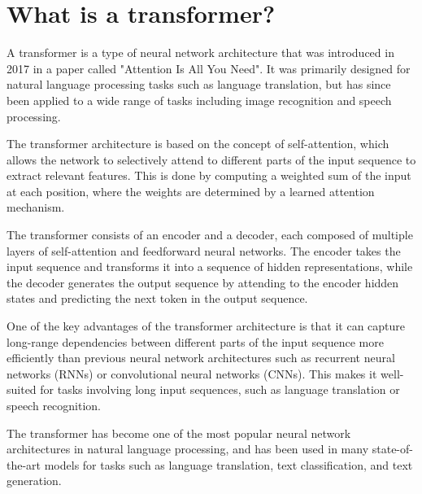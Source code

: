 \section{What is a transformer?}
A transformer is a type of neural network architecture that was introduced in 2017 in a paper called "Attention Is All You Need". It was primarily designed for natural language processing tasks such as language translation, but has since been applied to a wide range of tasks including image recognition and speech processing.

The transformer architecture is based on the concept of self-attention, which allows the network to selectively attend to different parts of the input sequence to extract relevant features. This is done by computing a weighted sum of the input at each position, where the weights are determined by a learned attention mechanism.

The transformer consists of an encoder and a decoder, each composed of multiple layers of self-attention and feedforward neural networks. The encoder takes the input sequence and transforms it into a sequence of hidden representations, while the decoder generates the output sequence by attending to the encoder hidden states and predicting the next token in the output sequence.

One of the key advantages of the transformer architecture is that it can capture long-range dependencies between different parts of the input sequence more efficiently than previous neural network architectures such as recurrent neural networks (RNNs) or convolutional neural networks (CNNs). This makes it well-suited for tasks involving long input sequences, such as language translation or speech recognition.

The transformer has become one of the most popular neural network architectures in natural language processing, and has been used in many state-of-the-art models for tasks such as language translation, text classification, and text generation.

